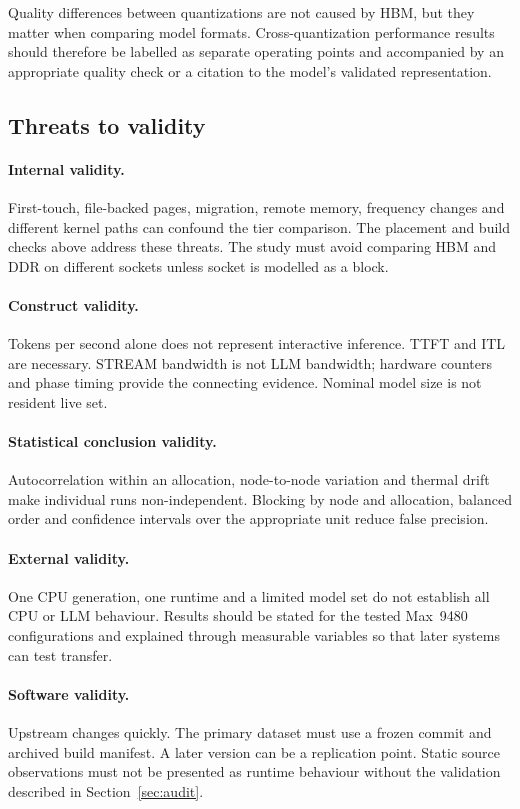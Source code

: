 Quality differences between quantizations are not caused by HBM, but
they matter when comparing model formats.  Cross-quantization
performance results should therefore be labelled as separate operating
points and accompanied by an appropriate quality check or a citation
to the model's validated representation.

\subsection{Threats to validity}

\paragraph{Internal validity.}
First-touch, file-backed pages, migration, remote memory, frequency
changes and different kernel paths can confound the tier comparison.
The placement and build checks above address these threats.  The study
must avoid comparing HBM and DDR on different sockets unless socket is
modelled as a block.

\paragraph{Construct validity.}
Tokens per second alone does not represent interactive inference.
TTFT and ITL are necessary.  STREAM bandwidth is not LLM bandwidth;
hardware counters and phase timing provide the connecting evidence.
Nominal model size is not resident live set.

\paragraph{Statistical conclusion validity.}
Autocorrelation within an allocation, node-to-node variation and
thermal drift make individual runs non-independent.  Blocking by node
and allocation, balanced order and confidence intervals over the
appropriate unit reduce false precision.

\paragraph{External validity.}
One CPU generation, one runtime and a limited model set do not establish
all CPU or LLM behaviour.  Results should be stated for the tested
Max~9480 configurations and explained through measurable variables so
that later systems can test transfer.

\paragraph{Software validity.}
Upstream \lcpp{} changes quickly.  The primary dataset must use a frozen
commit and archived build manifest.  A later version can be a
replication point.  Static source observations must not be presented as
runtime behaviour without the validation described in
Section~\ref{sec:audit}.

